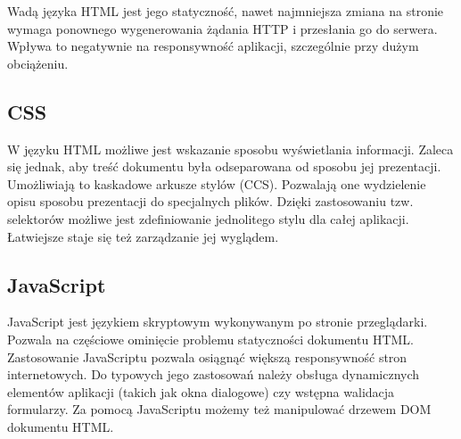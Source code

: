 Wadą języka HTML jest jego statyczność, nawet najmniejsza zmiana na stronie wymaga ponownego wygenerowania żądania HTTP i przesłania go do serwera. Wpływa to negatywnie na responsywność aplikacji, szczególnie przy dużym obciążeniu. 

\subsection[CSS][CSS]{CSS}
W języku HTML możliwe jest wskazanie sposobu wyświetlania informacji. Zaleca się jednak, aby treść dokumentu była odseparowana od sposobu jej prezentacji. Umożliwiają to kaskadowe arkusze stylów (CCS). Pozwalają one wydzielenie opisu sposobu prezentacji do specjalnych plików. Dzięki zastosowaniu tzw. selektorów możliwe jest zdefiniowanie jednolitego stylu dla całej aplikacji. Łatwiejsze staje się też zarządzanie jej wyglądem.

\subsection[JavaScript][JavaScript]{JavaScript}
JavaScript jest językiem skryptowym wykonywanym po stronie przeglądarki. Pozwala na częściowe ominięcie problemu statyczności dokumentu HTML. Zastosowanie JavaScriptu pozwala osiągnąć większą responsywność stron internetowych. Do typowych jego zastosowań należy obsługa dynamicznych elementów aplikacji (takich jak okna dialogowe) czy wstępna walidacja formularzy. Za pomocą JavaScriptu możemy też manipulować drzewem DOM dokumentu HTML.

